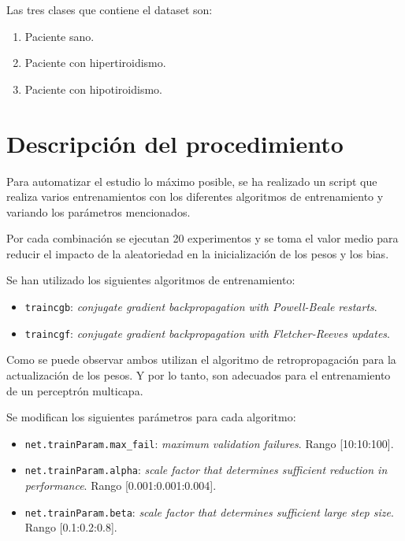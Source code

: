 \documentclass[a4paper,12pt,titlepage]{article}
\begin{document}
Las tres clases que contiene el dataset son:

\begin{enumerate}[noitemsep]
	\item Paciente sano.
	\item Paciente con hipertiroidismo.
	\item Paciente con hipotiroidismo.
\end{enumerate}

\section{Descripción del procedimiento}

Para automatizar el estudio lo máximo posible, se ha realizado un script que realiza varios entrenamientos con los diferentes algoritmos de entrenamiento y variando los parámetros mencionados. 

Por cada combinación se ejecutan 20 experimentos y se toma el valor medio para reducir el impacto de la aleatoriedad en la inicialización de los pesos y los bias.

Se han utilizado los siguientes algoritmos de entrenamiento:

\begin{itemize}[noitemsep]
	\item \lstinline|traincgb|: \textit{conjugate gradient backpropagation with Powell-Beale restarts}. \citep{matlab:traincgb}
	\item \lstinline|traincgf|: \textit{conjugate gradient backpropagation with Fletcher-Reeves updates}. \citep{matlab:traincgf}
\end{itemize}

Como se puede observar ambos utilizan el algoritmo de retropropagación para la actualización de los pesos. Y por lo tanto, son adecuados para el entrenamiento de un perceptrón multicapa.

Se modifican los siguientes parámetros para cada algoritmo:

\begin{itemize}[noitemsep]
	\item \lstinline|net.trainParam.max_fail|: \textit{maximum validation failures}. Rango [10:10:100].
	\item \lstinline|net.trainParam.alpha|: \textit{scale factor that determines sufficient reduction in performance}. Rango [0.001:0.001:0.004].
	\item \lstinline|net.trainParam.beta|: \textit{scale factor that determines sufficient large step size}. Rango [0.1:0.2:0.8].
\end{itemize}
\end{document}
